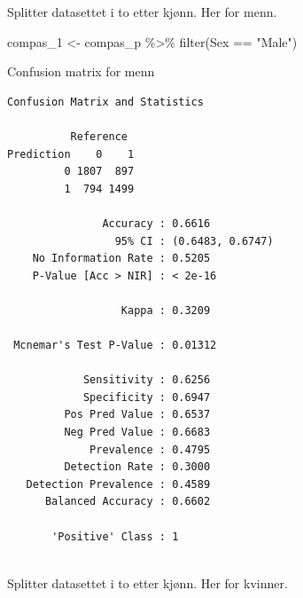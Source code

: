 \documentclass[
  letterpaper,
  DIV=11,
  numbers=noendperiod]{scrreprt}
\newenvironment{Shaded}{\begin{snugshade}}{\end{snugshade}}
\newcommand{\AttributeTok}[1]{\textcolor[rgb]{0.40,0.45,0.13}{#1}}
\newcommand{\FunctionTok}[1]{\textcolor[rgb]{0.28,0.35,0.67}{#1}}
\newcommand{\NormalTok}[1]{\textcolor[rgb]{0.00,0.23,0.31}{#1}}
\newcommand{\OtherTok}[1]{\textcolor[rgb]{0.00,0.23,0.31}{#1}}
\newcommand{\SpecialCharTok}[1]{\textcolor[rgb]{0.37,0.37,0.37}{#1}}
\newcommand{\StringTok}[1]{\textcolor[rgb]{0.13,0.47,0.30}{#1}}
\theoremstyle{definition}
\theoremstyle{remark}
\begin{document}
Splitter datasettet i to etter kjønn. Her for menn.

\begin{Shaded}
\begin{Highlighting}[]
\NormalTok{compas\_1 }\OtherTok{\textless{}{-}}\NormalTok{ compas\_p }\SpecialCharTok{\%\textgreater{}\%} 
  \FunctionTok{filter}\NormalTok{(Sex }\SpecialCharTok{==} \StringTok{"Male"}\NormalTok{)}
\end{Highlighting}
\end{Shaded}

Confusion matrix for menn

\begin{Shaded}
\end{Shaded}

\begin{verbatim}
Confusion Matrix and Statistics

          Reference
Prediction    0    1
         0 1807  897
         1  794 1499
                                          
               Accuracy : 0.6616          
                 95% CI : (0.6483, 0.6747)
    No Information Rate : 0.5205          
    P-Value [Acc > NIR] : < 2e-16         
                                          
                  Kappa : 0.3209          
                                          
 Mcnemar's Test P-Value : 0.01312         
                                          
            Sensitivity : 0.6256          
            Specificity : 0.6947          
         Pos Pred Value : 0.6537          
         Neg Pred Value : 0.6683          
             Prevalence : 0.4795          
         Detection Rate : 0.3000          
   Detection Prevalence : 0.4589          
      Balanced Accuracy : 0.6602          
                                          
       'Positive' Class : 1               
                                          
\end{verbatim}

Splitter datasettet i to etter kjønn. Her for kvinner.
\end{document}
